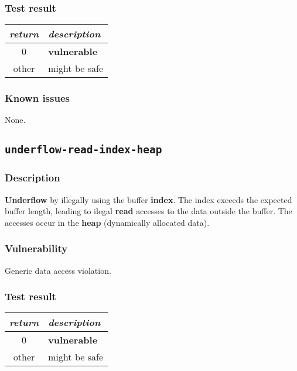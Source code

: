 \documentclass[a4paper]{book}
\begin{document}
\subsubsection{Test result}

\begin{tabular}{cl}
  \toprule
  \emph{return}  & \emph{description} \\
  \midrule
  0              & \textbf{vulnerable} \\
  other          & might be safe \\
  \bottomrule
\end{tabular}

\subsubsection{Known issues}

None.

\newpage

\subsection{\texttt{underflow-read-index-heap}}\label{test-underflow-read-index-heap}

\subsubsection{Description}

\textbf{Underflow} by illegally using the buffer \textbf{index}.
The index exceeds the expected buffer length,
leading to ilegal \textbf{read} accesses to the data outside the buffer.
The accesses occur in the \textbf{heap} (dynamically allocated data).

\subsubsection{Vulnerability}
Generic data access violation.

\subsubsection{Test result}

\begin{tabular}{cl}
  \toprule
  \emph{return}  & \emph{description} \\
  \midrule
  0              & \textbf{vulnerable} \\
  other          & might be safe \\
  \bottomrule
\end{tabular}
\end{document}

